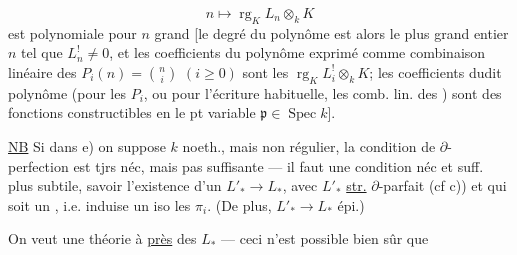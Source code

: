 \[
n\longmapsto\operatorname{rg}_K L_n\otimes_k K
\]
est polynomiale pour $n$ grand [le
degré du polynôme 
est alors le plus
grand entier $n$ tel que $L^!_n\neq0$, et les
coefficients du polynôme exprimé comme
combinaison linéaire des $P_i(n)=\binom ni$
$(i\geq0)$ sont les $\operatorname{rg}_K L^!_i\otimes_k K$;
les coefficients
dudit polynôme (pour les $P_i$, ou
pour l'écriture habituelle,  les
comb. lin. des ) sont des
fonctions constructibles en le pt variable
$\mathfrak p\in\operatorname{Spec}k$].

\uline{NB} Si dans e) on suppose $k$ noeth.,
mais non régulier, la condition  de
$\partial$-perfection est tjrs néc, mais pas
suffisante --- il faut une condition
néc et suff. plus subtile, savoir
l'existence d'un $L'_*\longrightarrow L_*$, avec
$L'_*$ \uline{str.} $\partial$-parfait (cf c)) et qui
soit un   , i.e. induise un iso
 les $\pi_i$. (De plus,  $L'_*\longrightarrow L_*$
épi.)

On veut une théorie à \uline{}
\uline{près} des $L_*$ 
--- ceci n'est possible bien sûr que
